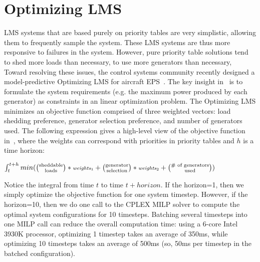 \documentclass{acm_proc_article-sp}
\newcommand*{\bfrac}[2]{\genfrac{(}{)}{0pt}{}{#1}{#2}} %
\begin{document}
\section{Optimizing LMS}
\label{sec:optimizing-LMS}
LMS systems that are based purely on priority tables are very simplistic, allowing them to frequently sample the system. 
These LMS systems are thus more responsive to failures in the system.
However, pure priority table solutions tend to shed more loads than necessary, to use more generators than necessary, 
Toward resolving these issues, the control systems community recently designed a model-predictive Optimizing LMS for aircraft EPS~\cite{mehdi}.
The key insight in~\cite{mehdi} is to formulate the system requirements (e.g. the maximum power produced by each generator) as constraints in an linear optimization problem.
The Optimizing LMS minimizes an objective function comprised of three weighted vectors: load shedding preference, generator selection preference, and number of generators used.
The following expression gives a high-level view of the objective function in~\cite{mehdi}, where the weights can correspond with priorities in priority tables and $h$ is a time horizon:

$\int_t^{t+h} min(\bfrac{\text{sheddable}}{\text{loads}} * \text{\scriptsize \emph{weights}$_1$} +  \bfrac{\text{generator}}{\text{selection}} * \text{\scriptsize \emph{weights}$_2$} +  \bfrac{\text{\scriptsize \# of generators}}{\text{\scriptsize  used}})$

Notice the integral from time $t$ to time $t+horizon$. 
If the horizon=1, then we simply optimize the objective function for one system timestep.
However, if the horizon=10, then we do one call to the CPLEX MILP solver to compute the optimal system configurations for 10 timesteps.
Batching several timesteps into one MILP call can reduce the overall computation time: using a 6-core Intel 3930K processor, optimizing 1 timestep takes an average of 350ms, while optimizing 10 timesteps takes an average of 500ms (so, 50ms per timestep in the batched configuration).
\end{document}
